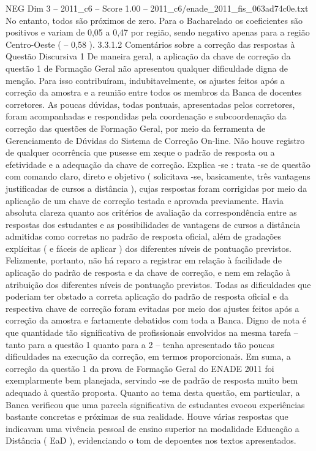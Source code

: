 \begin{textsample}{NEG Dim 3 – 2011\_c6 – Score 1.00 – 2011\_c6/enade\_2011\_fis\_063ad74c0e.txt}
No entanto, todos são próximos de zero.
Para o Bacharelado os coeficientes são positivos e variam de 0,05 a 0,47 por região, sendo negativo apenas para a região Centro-Oeste ( – 0,58 ). 3.3.1.2 Comentários sobre a correção das respostas à Questão Discursiva 1 De maneira geral, a aplicação da chave de correção da questão 1 de Formação Geral não apresentou qualquer dificuldade digna de menção.
Para isso contribuíram, indubitavelmente, os ajustes feitos após a correção da amostra e a reunião entre todos os membros da Banca de docentes corretores.
As poucas dúvidas, todas pontuais, apresentadas pelos corretores, foram acompanhadas e respondidas pela coordenação e subcoordenação da correção das questões de Formação Geral, por meio da ferramenta de Gerenciamento de Dúvidas do Sistema de Correção On-line.
Não houve registro de qualquer ocorrência que pusesse em xeque o padrão de resposta ou a efetividade e a adequação da chave de correção.
Explica -se : trata -se de questão com comando claro, direto e objetivo ( solicitava -se, basicamente, três vantagens justificadas de cursos a distância ), cujas respostas foram corrigidas por meio da aplicação de um chave de correção testada e aprovada previamente.
Havia absoluta clareza quanto aos critérios de avaliação da correspondência entre as respostas dos estudantes e as possibilidades de vantagens de cursos a distância admitidas como corretas no padrão de resposta oficial, além de gradações explícitas ( e fáceis de aplicar ) dos diferentes níveis de pontuação previstos.
Felizmente, portanto, não há reparo a registrar em relação à facilidade de aplicação do padrão de resposta e da chave de correção, e nem em relação à atribuição dos diferentes níveis de pontuação previstos.
Todas as dificuldades que poderiam ter obstado a correta aplicação do padrão de resposta oficial e da respectiva chave de correção foram evitadas por meio dos ajustes feitos após a correção da amostra e fartamente debatidos com toda a Banca.
Digno de nota é que quantidade tão significativa de profissionais envolvidos na mesma tarefa – tanto para a questão 1 quanto para a 2 – tenha apresentado tão poucas dificuldades na execução da correção, em termos proporcionais.
Em suma, a correção da questão 1 da prova de Formação Geral do ENADE 2011 foi exemplarmente bem planejada, servindo -se de padrão de resposta muito bem adequado à questão proposta.
Quanto ao tema desta questão, em particular, a Banca verificou que uma parcela significativa de estudantes evocou experiências bastante concretas e próximas de sua realidade.
Houve várias respostas que indicavam uma vivência pessoal de ensino superior na modalidade Educação a Distância ( EaD ), evidenciando o tom de depoentes nos textos apresentados.

\end{textsample}
